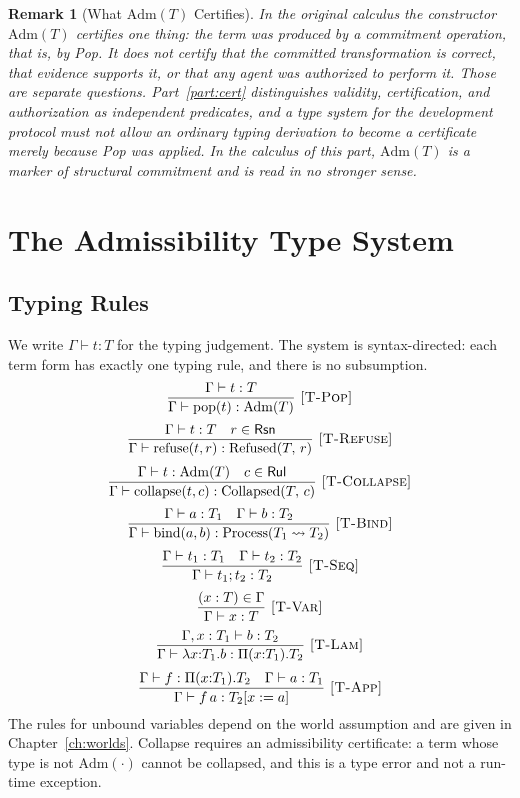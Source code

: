 \documentclass[12pt,oneside,openany]{book}
\theoremstyle{spherepop}
\theoremstyle{remarkstyle}
\newtheorem{remark}[definition]{Remark}
\newcommand{\Adm}[1]{\mathrm{Adm}(#1)}
\newcommand{\Refused}[2]{\mathrm{Refused}(#1,\,#2)}
\newcommand{\Collapsed}[2]{\mathrm{Collapsed}(#1,\,#2)}
\newcommand{\yields}{\rightsquigarrow}
\begin{document}
\begin{remark}[What $\Adm{T}$ Certifies]
\label{rem:adm-scope}
In the original calculus the constructor $\Adm{T}$ certifies one thing: the term was produced by a commitment operation, that is, by Pop. It does not certify that the committed transformation is correct, that evidence supports it, or that any agent was authorized to perform it. Those are separate questions. Part~\ref{part:cert} distinguishes validity, certification, and authorization as independent predicates, and a type system for the development protocol must not allow an ordinary typing derivation to become a certificate merely because Pop was applied. In the calculus of this part, $\Adm{T}$ is a marker of structural commitment and is read in no stronger sense.
\end{remark}

\chapter{The Admissibility Type System}
\label{ch:types}

\section{Typing Rules}

We write $\Gamma\vdash t:T$ for the typing judgement. The system is syntax-directed: each term form has exactly one typing rule, and there is no subsumption.
\[
\frac{\Gamma\vdash t:T}{\Gamma\vdash\mathrm{pop}(t):\Adm{T}}\ \textsc{[T-Pop]}
\]
\[
\frac{\Gamma\vdash t:T\quad r\in\mathsf{Rsn}}{\Gamma\vdash\mathrm{refuse}(t,r):\Refused{T}{r}}\ \textsc{[T-Refuse]}
\]
\[
\frac{\Gamma\vdash t:\Adm{T}\quad c\in\mathsf{Rul}}{\Gamma\vdash\mathrm{collapse}(t,c):\Collapsed{T}{c}}\ \textsc{[T-Collapse]}
\]
\[
\frac{\Gamma\vdash a:T_1\quad\Gamma\vdash b:T_2}{\Gamma\vdash\mathrm{bind}(a,b):\mathrm{Process}(T_1\yields T_2)}\ \textsc{[T-Bind]}
\]
\[
\frac{\Gamma\vdash t_1:T_1\quad\Gamma\vdash t_2:T_2}{\Gamma\vdash t_1;t_2:T_2}\ \textsc{[T-Seq]}
\]
\[
\frac{(x:T)\in\Gamma}{\Gamma\vdash x:T}\ \textsc{[T-Var]}
\]
\[
\frac{\Gamma,x:T_1\vdash b:T_2}{\Gamma\vdash\lambda x{:}T_1.b:\Pi(x{:}T_1).T_2}\ \textsc{[T-Lam]}
\]
\[
\frac{\Gamma\vdash f:\Pi(x{:}T_1).T_2\quad\Gamma\vdash a:T_1}{\Gamma\vdash f\,a:T_2[x:=a]}\ \textsc{[T-App]}
\]
The rules for unbound variables depend on the world assumption and are given in Chapter~\ref{ch:worlds}. Collapse requires an admissibility certificate: a term whose type is not $\Adm{\cdot}$ cannot be collapsed, and this is a type error and not a run-time exception.
\end{document}
